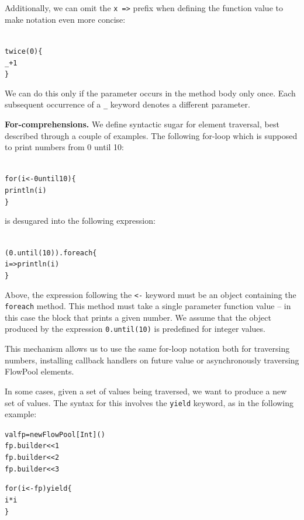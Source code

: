 \documentclass[runningheads,a4paper]{llncs}
\begin{document}
Additionally, we can omit the \verb+x =>+ prefix when defining the function value to
make notation even more concise:

\begin{minipage}[b]{3.75 cm}
\begin{alltt}
{\scriptsize
twice(0) \{
  _ + 1
\}
}
\end{alltt}
\end{minipage}

We can do this only if the parameter occurs in the method body only once. Each subsequent
occurrence of a \verb=_= keyword denotes a different parameter.


\textbf{For-comprehensions.}
We define syntactic sugar for element traversal, best described through a couple of
examples.
The following for-loop which is supposed to print numbers from 0 until 10:

\begin{minipage}[b]{3.75 cm}
\begin{alltt}
{\scriptsize
for (i <- 0 until 10) \{
  println(i)
\}
}
\end{alltt}
\end{minipage}

is desugared into the following expression:

\begin{minipage}[b]{3.75 cm}
\begin{alltt}
{\scriptsize
(0.until(10)).foreach \{
  i => println(i)
\}
}
\end{alltt}
\end{minipage}

Above, the expression following the \verb=<-= keyword must be an object containing
the \verb=foreach= method.
This method must take a single parameter function value -- in this case the block
that prints a given number.
We assume that the object produced by the expression \verb=0.until(10)= is
predefined for integer values.

This mechanism allows us to use the same for-loop notation both for traversing
numbers, installing callback handlers on future value or asynchronously traversing
FlowPool elements.

In some cases, given a set of values being traversed, we want to produce a new
set of values.
The syntax for this involves the \verb=yield= keyword, as in the following example:

\begin{minipage}[b]{3.75 cm}
\begin{alltt}
{\scriptsize
val fp = new FlowPool[Int]()
fp.builder << 1
fp.builder << 2
fp.builder << 3

for (i <- fp) yield \{
  i * i
\}
}
\end{alltt}
\end{minipage}
\end{document}
